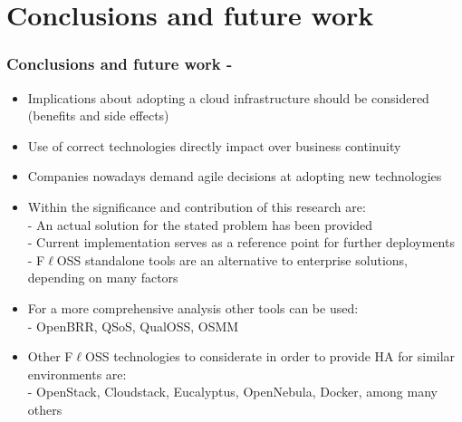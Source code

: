 \section{Conclusions and future work}

\begin{frame}[allowframebreaks]
\frametitle{Conclusions and future work -}

\begin{itemize}
  \item Implications about adopting a cloud infrastructure should be considered (benefits and side effects)
  \item Use of correct technologies directly impact over business continuity
  \item Companies nowadays demand agile decisions at adopting new technologies
  \item Within the significance and contribution of this research are:\\
  - An actual solution for the stated problem has been provided\\
  - Current implementation serves as a reference point for further deployments\\
  - F$\ell$OSS standalone tools are an alternative to enterprise solutions, depending on many factors
  \item For a more comprehensive analysis other tools can be used:\\
  - OpenBRR, QSoS, QualOSS, OSMM
  \vspace{0.2cm}
  \item Other F$\ell$OSS technologies to considerate in order to provide HA for similar environments are:\\
  - OpenStack, Cloudstack, Eucalyptus, OpenNebula, Docker, among many others
  
\end{itemize}

\end{frame}